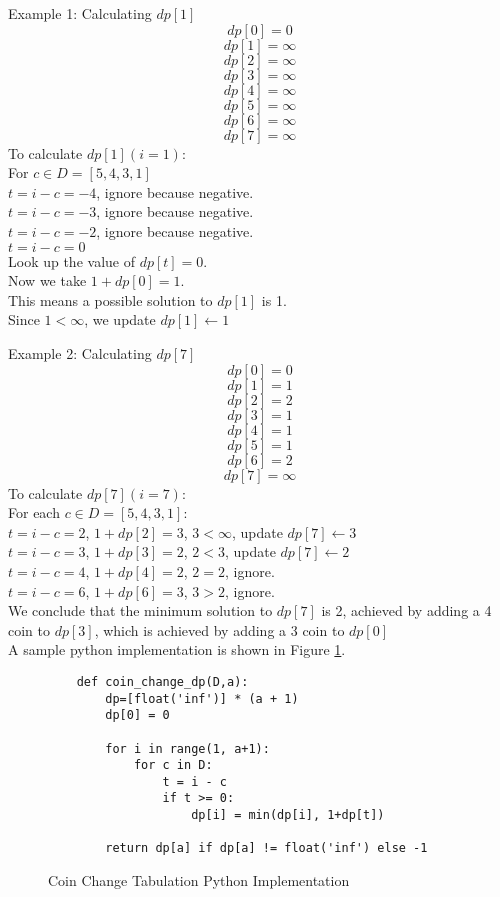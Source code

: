 Example 1: Calculating $dp[1]$
$$dp[0]=0$$
$$dp[1]=\infty$$
$$dp[2]=\infty$$
$$dp[3]=\infty$$
$$dp[4]=\infty$$
$$dp[5]=\infty$$
$$dp[6]=\infty$$
$$dp[7]=\infty$$
To calculate $dp[1] (i=1)$:\\
For $c \in D = [5,4,3,1]$\\
$t = i-c = -4$, ignore because negative.\\
$t = i-c = -3$, ignore because negative.\\
$t = i-c = -2$, ignore because negative.\\
$t = i-c = 0$\\
Look up the value of $dp[t] = 0$.\\
Now we take $1 + dp[0] = 1$.\\
This means a possible solution to $dp[1]$ is 1.\\
Since $1 < \infty$, we update $dp[1] \leftarrow 1$

Example 2: Calculating $dp[7]$
$$dp[0]=0$$
$$dp[1]=1$$
$$dp[2]=2$$
$$dp[3]=1$$
$$dp[4]=1$$
$$dp[5]=1$$
$$dp[6]=2$$
$$dp[7]=\infty$$
To calculate $dp[7] (i=7)$:\\
For each $c \in D = [5,4,3,1]$:\\
$t = i-c = 2$, $1 + dp[2] = 3$, $3 < \infty$, update $dp[7] \leftarrow 3$\\
$t = i-c = 3$, $1+dp[3] = 2$, $2 < 3$, update $dp[7] \leftarrow 2$\\
$t = i-c = 4$, $1+dp[4] = 2$, $2 = 2$, ignore.\\
$t = i-c = 6$, $1+dp[6] = 3$, $3 > 2$, ignore.\\
We conclude that the minimum solution to $dp[7]$ is 2, achieved by adding a 4 coin to $dp[3]$, which is achieved by adding a 3 coin to $dp[0]$\\
A sample python implementation is shown in Figure \ref{fig:coin-change-dp}.\\

\begin{figure}[H]
    \centering
    \begin{lstlisting}
    def coin_change_dp(D,a):
        dp=[float('inf')] * (a + 1)
        dp[0] = 0
    
        for i in range(1, a+1):
            for c in D:
                t = i - c
                if t >= 0:
                    dp[i] = min(dp[i], 1+dp[t])
    
        return dp[a] if dp[a] != float('inf') else -1
    \end{lstlisting}
    \caption{Coin Change Tabulation Python Implementation}
    \label{fig:coin-change-dp}
\end{figure}

